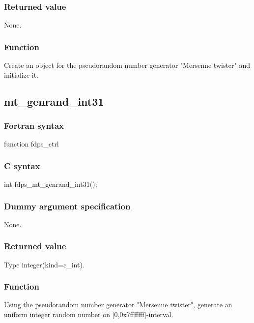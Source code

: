 \subsubsection*{Returned value}
None.

\subsubsection*{Function}
Create an object for the pseudorandom number generator "Mersenne twister" and initialize it.
\clearpage

\subsection{mt\_genrand\_int31}
\subsubsection*{Fortran syntax}
\begin{screen}
\begin{spverbatim}
function fdps_ctrl%
\end{spverbatim}
\end{screen}

\subsubsection*{C syntax}
\begin{screen}
\begin{spverbatim}
int fdps_mt_genrand_int31();
\end{spverbatim}
\end{screen}

\subsubsection*{Dummy argument specification}
None.

\subsubsection*{Returned value}
Type integer(kind=c\_int).

\subsubsection*{Function}
Using the pseudorandom number generator "Mersenne twister", generate an uniform integer random number on [0,0x7fffffff]-interval.
\clearpage

